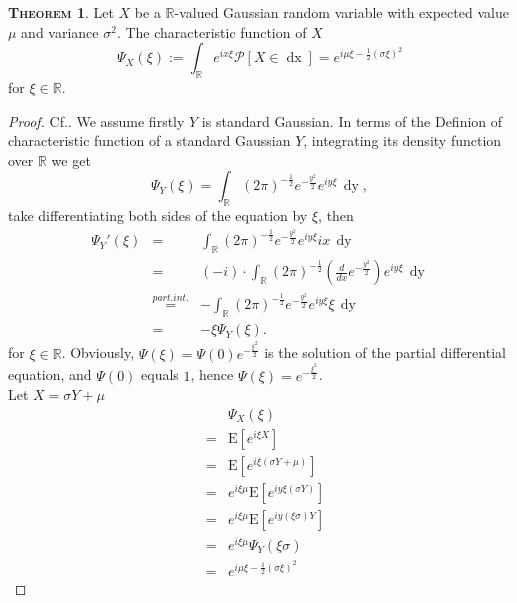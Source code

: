\documentclass[a4paper, twoside, 11pt]{article}
\theoremstyle{definition}
\newtheorem{theorem}[definition]{\scshape Theorem}
\newcommand{\sqbr}[1]{\left[ {#1} \right]}
\begin{document}
\begin{theorem}
  Let $X$ be a $\mathbb{R}$-valued Gaussian random variable with expected value $\mu$ and variance $\sigma^2$. The characteristic function of $X$
\begin{equation}
  \Psi_X(\xi) := \int_\mathbb{R} e^{ix\xi}\mathcal{P}\sqbr{X \in \mathop{dx}} = e^{i\mu\xi-\frac{1}{2}(\sigma\xi)^2}
  \label{sec:cht}
\end{equation}
for $\xi \in \mathbb{R}$.
\label{sec:char}
\end{theorem}
\begin{proof}
  Cf.\cite{shilling}. We assume firstly $Y$ is standard Gaussian. In terms of the Definion of characteristic function of a standard Gaussian $Y$, integrating its density function over $\mathbb{R}$ we get
  \begin{equation*}
	\Psi_Y(\xi) = \int_\mathbb{R} (2\pi)^{-\frac{1}{2}}e^{-\frac{y^2}{2}}e^{iy\xi}\,\mathop{dy},
  \end{equation*}
take differentiating both sides of the equation by $\xi$, then
\begin{eqnarray*}
\Psi_Y'(\xi) &=& \int_\mathbb{R}(2\pi)^{-\frac{1}{2}}e^{-\frac{y^2}{2}}e^{iy\xi}ix\,\mathop{dy}\\
             &=& (-i)\cdot\int_\mathbb{R} (2\pi)^{-\frac{1}{2}}(\frac{d}{dx}e^{-\frac{y^2}{2}})e^{iy\xi}\,\mathop{dy}\\
			 &\overset{part.int.}{=}& -\int_\mathbb{R}(2\pi)^{-\frac{1}{2}}e^{-\frac{y^2}{2}}e^{iy\xi}\xi\,\mathop{dy}\\
			 &=& -\xi\Psi_Y(\xi).
\end{eqnarray*}
for $\xi \in \mathbb{R}$. Obviously, 
$\Psi(\xi) = \Psi(0)e^{-\frac{\xi^2}{2}}$ is the solution of the partial differential equation, and $\Psi(0)$ equals $1$, hence $\Psi(\xi) = e^{-\frac{\xi^2}{2}}$.\\
Let $X =\sigma Y + \mu$
\begin{eqnarray*}
  && \Psi_X(\xi)\\
  &=& \mathrm{E}[e^{i\xi X}]\\
  &=& \mathrm{E}[e^{i\xi (\sigma Y + \mu) }]\\
  &=& e^{i\xi\mu} \mathrm{E}[e^{iy\xi (\sigma Y)}]\\
  &=& e^{i\xi\mu} \mathrm{E}[e^{iy (\xi \sigma) Y}]\\
  &=& e^{i\xi\mu} \Psi_Y(\xi\sigma)\\
  &=& e^{i\mu\xi-\frac{1}{2}(\sigma\xi)^2}
\end{eqnarray*}
\end{proof}
\end{document}

